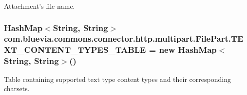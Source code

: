Attachment's file name. \hypertarget{classcom_1_1bluevia_1_1commons_1_1connector_1_1http_1_1multipart_1_1FilePart_a9899cc3c8467b5ac76040a8f4260f46d}{
\subsubsection[{TEXT\_\-CONTENT\_\-TYPES\_\-TABLE}]{\setlength{\rightskip}{0pt plus 5cm}HashMap$<$String, String$>$ {\bf com.bluevia.commons.connector.http.multipart.FilePart.TEXT\_\-CONTENT\_\-TYPES\_\-TABLE} = new HashMap$<$String, String$>$()}}
\label{classcom_1_1bluevia_1_1commons_1_1connector_1_1http_1_1multipart_1_1FilePart_a9899cc3c8467b5ac76040a8f4260f46d}
Table containing supported text type content types and their corresponding charsets. 